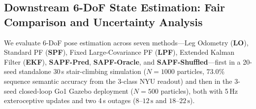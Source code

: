 \documentclass[11pt, a4paper]{article}
\begin{document}
\begin{table}[htbp]
    \centering
    \caption{Hyperparameter sensitivity analysis for the softmax gating temperature $\lambda$ (NYU subset at severe degradation level 2.0, $r_{\text{oc}}=1$) and the over-clustering ratio $r_{\text{oc}} = K/C$ (Go1 351-sample set under Blocked 5-fold CV, $\lambda=4$).}
    \label{tab:sensitivity}
    \scriptsize
    \setlength{\tabcolsep}{3.2pt}
    \renewcommand{\arraystretch}{1.15}
\end{table}

\subsection{Downstream 6-DoF State Estimation: Fair Comparison and Uncertainty Analysis}
\label{subsec:sapf_exp}
We evaluate 6-DoF pose estimation across seven methods—Leg Odometry (\textbf{LO}), Standard PF (\textbf{SPF}), Fixed Large-Covariance PF (\textbf{LPF}), Extended Kalman Filter (\textbf{EKF}), \textbf{SAPF-Pred}, \textbf{SAPF-Oracle}, and \textbf{SAPF-Shuffled}—first in a 20-seed standalone 30\,s stair-climbing simulation ($N=1000$ particles, $73.0\%$ sequence semantic accuracy from the 3-class NYU readout) and then in the 3-seed closed-loop Go1 Gazebo deployment ($N=500$ particles), both with 5\,Hz exteroceptive updates and two 4\,s outages ($8$--$12\,\text{s}$ and $18$--$22\,\text{s}$).
\end{document}
